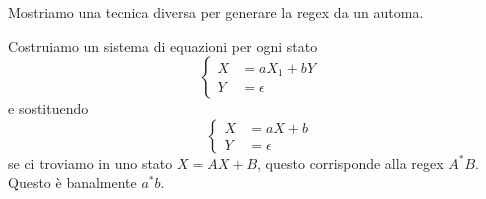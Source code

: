 \documentclass[12pt]{report}
\begin{document}
\begin{tcolorbox}
	Mostriamo una tecnica diversa per generare la regex da un automa.
	\begin{center}
	\end{center}
	Costruiamo un sistema di equazioni per ogni stato
	$$
	\begin{cases}
		X &= a X_1 + b Y \\
		Y &= \epsilon
	\end{cases}
	$$
	e sostituendo 
	$$
	\begin{cases}
		X &= a X + b  \\
		Y &= \epsilon
	\end{cases}
	$$
	se ci troviamo in uno stato $X = A X + B$, questo corrisponde alla regex $A^* B$.
	Questo è banalmente $a^*b$.
\end{tcolorbox}
\end{document}
